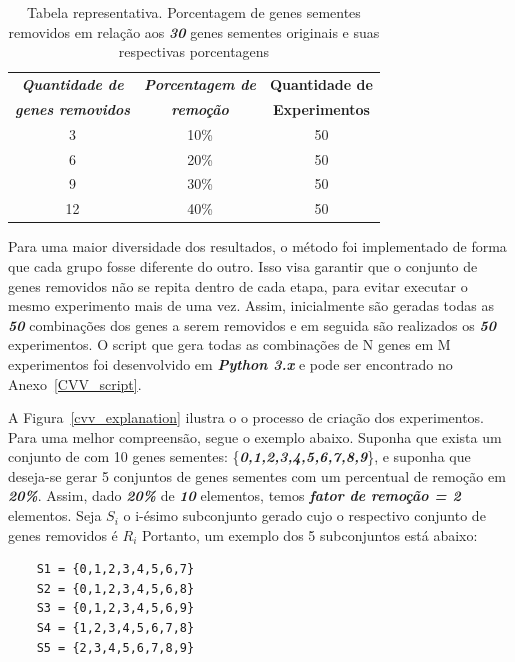\begin{table}[]
\centering
\caption{Tabela representativa. Porcentagem de genes sementes removidos em relação aos \textsl{\textbf{30}} genes sementes originais e suas respectivas porcentagens}
\label{table_gene_execucao}
\begin{tabular}{@{}ccc@{}}
\toprule
\textbf{\textsl{Quantidade de}} & \textbf{\textsl{Porcentagem de}} & \textbf{Quantidade de} \\ 
\textbf{\textsl{genes removidos}} & \textbf{\textsl{remoção}} & \textbf{Experimentos} \\ \midrule
3 & 10\% & 50 \\
6 & 20\% & 50 \\
9 & 30\% & 50 \\
12& 40\% & 50 \\ \bottomrule
\end{tabular}
\end{table}

Para uma maior diversidade dos resultados, o método foi implementado de forma que cada grupo fosse diferente do outro.
%
Isso visa garantir que o conjunto de genes removidos não se repita dentro de cada etapa, para evitar executar o mesmo experimento mais de uma vez.
Assim, inicialmente são geradas todas as \textsl{\textbf{50}} combinações dos genes a serem removidos e em seguida são realizados os \textsl{\textbf{50}} experimentos.
%
O script que gera todas as combinações de N genes em M experimentos foi desenvolvido em \textsl{\textbf{Python 3.x}} e pode ser encontrado no Anexo~\ref{CVV_script}.


A Figura~\ref{cvv_explanation} ilustra o o processo de criação dos experimentos.
%
Para uma melhor compreensão, segue o exemplo abaixo.
Suponha que exista um conjunto de com 10 genes sementes: \{\textsl{\textbf{0,1,2,3,4,5,6,7,8,9}}\}, e suponha que deseja-se gerar 5 conjuntos de genes sementes com um percentual de remoção em \textsl{\textbf{20\%}}.
%
Assim, dado \textsl{\textbf{20\%}} de \textsl{\textbf{10}} elementos, temos \textsl{\textbf{fator de remoção = 2}} elementos.
Seja $S_i$ o i-ésimo subconjunto gerado cujo o respectivo conjunto de genes removidos é $R_i$
Portanto, um exemplo dos 5 subconjuntos está abaixo:

\begin{lstlisting}
    S1 = {0,1,2,3,4,5,6,7}
    S2 = {0,1,2,3,4,5,6,8}
    S3 = {0,1,2,3,4,5,6,9}
    S4 = {1,2,3,4,5,6,7,8}
    S5 = {2,3,4,5,6,7,8,9}
\end{lstlisting}

